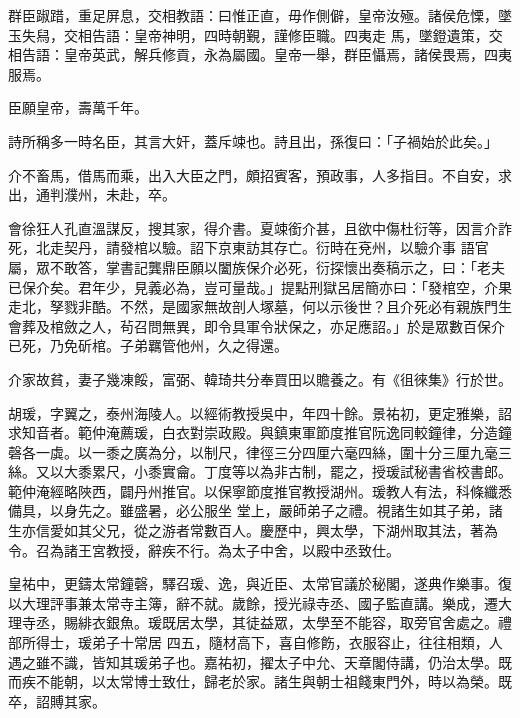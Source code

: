 \begin{pinyinscope}
 群臣踧踖，重足屏息，交相教語：曰惟正直，毋作側僻，皇帝汝殛。諸侯危慄，墜玉失舄，交相告語：皇帝神明，四時朝覲，謹修臣職。四夷走
 馬，墜鐙遺策，交相告語：皇帝英武，解兵修貢，永為屬國。皇帝一舉，群臣懾焉，諸侯畏焉，四夷服焉。



 臣願皇帝，壽萬千年。



 詩所稱多一時名臣，其言大奸，蓋斥竦也。詩且出，孫復曰：「子禍始於此矣。」



 介不畜馬，借馬而乘，出入大臣之門，頗招賓客，預政事，人多指目。不自安，求出，通判濮州，未赴，卒。



 會徐狂人孔直溫謀反，搜其家，得介書。夏竦銜介甚，且欲中傷杜衍等，因言介詐死，北走契丹，請發棺以驗。詔下京東訪其存亡。衍時在兗州，以驗介事
 語官屬，眾不敢答，掌書記龔鼎臣願以闔族保介必死，衍探懷出奏稿示之，曰：「老夫已保介矣。君年少，見義必為，豈可量哉。」提點刑獄呂居簡亦曰：「發棺空，介果走北，孥戮非酷。不然，是國家無故剖人塚墓，何以示後世？且介死必有親族門生會葬及棺斂之人，茍召問無異，即令具軍令狀保之，亦足應詔。」於是眾數百保介已死，乃免斫棺。子弟羈管他州，久之得還。



 介家故貧，妻子幾凍餒，富弼、韓琦共分奉買田以贍養之。有《徂徠集》行於世。



 胡瑗，字翼之，泰州海陵人。以經術教授吳中，年四十餘。景祐初，更定雅樂，詔求知音者。範仲淹薦瑗，白衣對崇政殿。與鎮東軍節度推官阮逸同較鐘律，分造鐘磬各一虡。以一黍之廣為分，以制尺，律徑三分四厘六毫四絲，圍十分三厘九毫三絲。又以大黍累尺，小黍實龠。丁度等以為非古制，罷之，授瑗試秘書省校書郎。範仲淹經略陜西，闢丹州推官。以保寧節度推官教授湖州。瑗教人有法，科條纖悉備具，以身先之。雖盛暑，必公服坐
 堂上，嚴師弟子之禮。視諸生如其子弟，諸生亦信愛如其父兄，從之游者常數百人。慶歷中，興太學，下湖州取其法，著為令。召為諸王宮教授，辭疾不行。為太子中舍，以殿中丞致仕。



 皇祐中，更鑄太常鐘磬，驛召瑗、逸，與近臣、太常官議於秘閣，遂典作樂事。復以大理評事兼太常寺主簿，辭不就。歲餘，授光祿寺丞、國子監直講。樂成，遷大理寺丞，賜緋衣銀魚。瑗既居太學，其徒益眾，太學至不能容，取旁官舍處之。禮部所得士，瑗弟子十常居
 四五，隨材高下，喜自修飭，衣服容止，往往相類，人遇之雖不識，皆知其瑗弟子也。嘉祐初，擢太子中允、天章閣侍講，仍治太學。既而疾不能朝，以太常博士致仕，歸老於家。諸生與朝士祖餞東門外，時以為榮。既卒，詔賻其家。




\end{pinyinscope}
